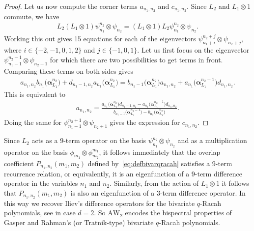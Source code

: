 \documentclass[pdftex]{sigma}
\numberwithin{equation}{section}
\newcommand{\AW}[1]{\mathrm{AW}_{#1}}
\begin{document}
\begin{proof}
Let us now compute the corner terms $a_{n_1,n_2}$ and $c_{n_1,n_2}$. Since $L_2$ and $L_1\otimes 1$ commute, we have
	\begin{gather*}
		L_2 (L_1\otimes 1) \psi_{n_1}^{n_2}\otimes \psi_{n_2} = (L_1\otimes 1)L_2 \psi_{n_1}^{n_2}\otimes \psi_{n_2}.
	\end{gather*}
	Working this out gives 15 equations for each of the eigenvectors $\psi_{n_1+i}^{n_2+j}\otimes\psi_{n_2+j}$, where $i\in\{-2,-1,0,1,2\}$ and $j\in\{-1,0,1\}$. Let us first focus on the eigenvector $\psi_{n_1-1}^{n_2-1}\otimes\psi_{n_2-1}$ for which there are two possibilities to get terms in front. Comparing these terms on both sides gives
	\begin{gather*}
		a_{n_1,n_2}b_{n_1}\big(\bm{\alpha}_{L_1}^{n_2}\big)+d_{n_1-1,n_2}a_{n_1}\big(\bm{\alpha}_{L_1}^{n_2}\big)= b_{n_1-1}\big(\bm{\alpha}_{L_1}^{n_2}\big)a_{n_1,n_2}+a_{n_1}\big(\bm{\alpha}_{L_1}^{n_2-1}\big)d_{n_1,n_2}.
	\end{gather*}
	This is equivalent to
	\begin{gather*}
		a_{n_1,n_2} = \frac{a_{n_1}\big(\bm{\alpha}_{L_1}^{n_2}\big)d_{n_1-1,n_2}-a_{n_1}\big(\bm{\alpha}_{L_1}^{n_2-1}\big)d_{n_1,n_2}}{b_{n_1-1}\big(\bm{\alpha}_{L_1}^{n_2-1}\big) -b_{n_1}\big(\bm{\alpha}_{L_1}^{n_2}\big)}.
	\end{gather*}
	Doing the same for $\psi_{n_1-1}^{n_2+1}\otimes\psi_{n_2+1}$ gives the expression for $c_{n_1,n_2}$.
\end{proof}

Since $L_2$ acts as a $9$-term operator on the basis $\psi_{n_1}^{n_2} \otimes \psi_{n_2}$ and as a multiplication operator on the basis $\phi_{m_1} \otimes \phi_{m_2}^{m_1}$, it follows immediately that the overlap coefficient $P_{n_1,n_2}(m_1,m_2)$ defined by~\eqref{eq:defbivarqracah}
satisfies a $9$-term recurrence relation, or equivalently, it is an eigenfunction of a $9$-term difference operator in the variables $n_1$ and $n_2$. Similarly, from the action of $L_1\otimes1$ it follows that $P_{n_1,n_2}(m_1,m_2)$ is also an eigenfunction of a $3$-term difference operator. In this way we recover Iliev's difference operators for the bivariate $q$-Racah polynomials, see \cite[Proposition~4.5 and Remark~2.3]{Iliev2011} in case $d=2$. So $\AW{2}$ encodes the bispectral properties of Gasper and Rahman's (or Tratnik-type) bivariate $q$-Racah polynomials.
\end{document}
